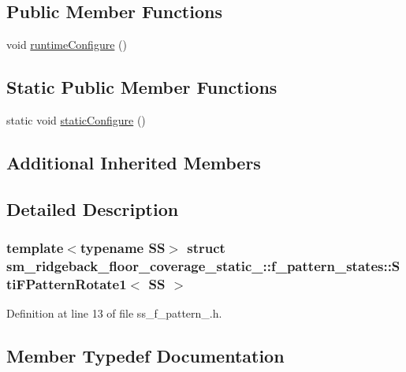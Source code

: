 \subsection*{Public Member Functions}
\begin{DoxyCompactItemize}
\item 
void \hyperlink{classsm__ridgeback__floor__coverage__static__1_1_1f__pattern__states_1_1StiFPatternRotate1_a305ce3b23789e8f727d2948f5eba65d5}{runtime\+Configure} ()
\end{DoxyCompactItemize}
\subsection*{Static Public Member Functions}
\begin{DoxyCompactItemize}
\item 
static void \hyperlink{classsm__ridgeback__floor__coverage__static__1_1_1f__pattern__states_1_1StiFPatternRotate1_ab1a20e9e768f24ee82842da1aed0dcc8}{static\+Configure} ()
\end{DoxyCompactItemize}
\subsection*{Additional Inherited Members}


\subsection{Detailed Description}
\subsubsection*{template$<$typename SS$>$\newline
struct sm\+\_\+ridgeback\+\_\+floor\+\_\+coverage\+\_\+static\+\_\+::f\+\_\+pattern\+\_\+states\+::\+Sti\+F\+Pattern\+Rotate1$<$ S\+S $>$}



Definition at line 13 of file ss\+\_\+f\+\_\+pattern\+\_.\+h.



\subsection{Member Typedef Documentation}
\mbox{\label{classsm__ridgeback__floor__coverage__static__1_1_1f__pattern__states_1_1StiFPatternRotate1_ab0dfd621289313eafdd92afc1bcd520c}} 
